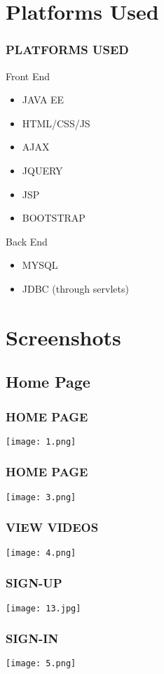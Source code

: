 \documentclass{beamer}
\begin{document}
\section{Platforms Used}
    \begin{frame}\frametitle{PLATFORMS USED}
\begin{block}{}
Front End
	\begin{itemize}
		\item JAVA EE 
		\item HTML/CSS/JS
		\item AJAX
		\item JQUERY
	    \item JSP
	    \item BOOTSTRAP
	\end{itemize}
Back End
	\begin{itemize}
	    \item MYSQL
	    \item JDBC (through servlets)
	\end{itemize}
\end{block}
\end{frame}







\section{Screenshots}
\subsection{Home Page}
\begin{frame}\frametitle{HOME PAGE}
		\texttt{[image: 1.png]}
\end{frame}


\begin{frame}\frametitle{HOME PAGE}
		\texttt{[image: 3.png]}
\end{frame}

\begin{frame}\frametitle{VIEW VIDEOS}
		\texttt{[image: 4.png]}
\end{frame}


\begin{frame}\frametitle{SIGN-UP}
		\texttt{[image: 13.jpg]}
\end{frame}

\begin{frame}\frametitle{SIGN-IN}
		\texttt{[image: 5.png]}
\end{frame}
\end{document}
